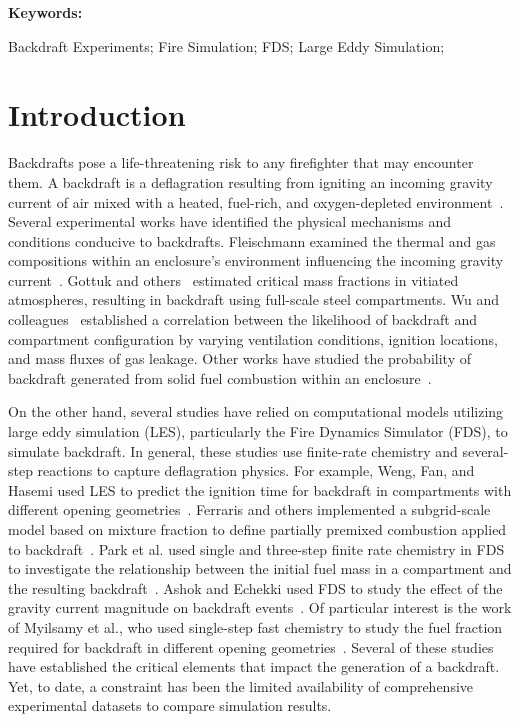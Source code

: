 \documentclass[12pt,letterpaper]{article}
\begin{document}
\begin{flushleft}
\textbf{Keywords:}

Backdraft Experiments; Fire Simulation; FDS; Large Eddy Simulation; 

\section{Introduction}
Backdrafts pose a life-threatening risk to any firefighter that may encounter them. A backdraft is a deflagration resulting from igniting an incoming gravity current of air mixed with a heated, fuel-rich, and oxygen-depleted environment~\cite{fleischmann2013defining}. Several experimental works have identified the physical mechanisms and conditions conducive to backdrafts. Fleischmann examined the thermal and gas compositions within an enclosure's environment influencing the incoming gravity current~\cite{fleischmann1993backdraft,fleischmann1994quantitative}. Gottuk and others~\cite{gottuk1999development} estimated critical mass fractions in vitiated atmospheres, resulting in backdraft using full-scale steel compartments. Wu and colleagues~\cite{wu2011experimental} established a correlation between the likelihood of backdraft and compartment configuration by varying ventilation conditions, ignition locations, and mass fluxes of gas leakage. Other works have studied the probability of backdraft generated from solid fuel combustion within an enclosure~\cite{hayasaka2008backdraft,tsai2013full,zhao2021experimental}.

On the other hand, several studies have relied on computational models utilizing large eddy simulation (LES), particularly the Fire Dynamics Simulator (FDS), to simulate backdraft. In general, these studies use finite-rate chemistry and several-step reactions to capture deflagration physics. For example, Weng, Fan, and Hasemi used LES to predict the ignition time for backdraft in compartments with different opening geometries~\cite{weng2005prediction}. Ferraris and others implemented a subgrid-scale model based on mixture fraction to define partially premixed combustion applied to backdraft~\cite{ferraris2008large}. Park et al. used single and three-step finite rate chemistry in FDS to investigate the relationship between the initial fuel mass in a compartment and the resulting backdraft~\cite{park2017computational}.  Ashok and Echekki used FDS to study the effect of the gravity current magnitude on backdraft events~\cite{ashok2021numerical}. Of particular interest is the work of Myilsamy et al., who used single-step fast chemistry to study the fuel fraction required for backdraft in different opening geometries~\cite{myilsamy2019large}.
Several of these studies have established the critical elements that impact the generation of a backdraft. Yet, to date, a constraint has been the limited availability of comprehensive experimental datasets to compare simulation results. 


\end{flushleft}
\end{document}
